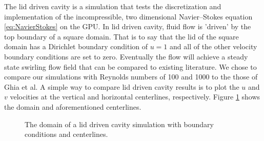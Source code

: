 The lid driven cavity is a simulation that tests the discretization and implementation of the incompressible, two dimensional Navier--Stokes equation \eqref{eq:NavierStokes} on the GPU. 
In lid driven cavity, fluid flow is 'driven' by the top boundary of a square domain. 
That is to say that the lid of the square domain has a Dirichlet boundary condition of $u=1$ and all of the other velocity boundary conditions are set to zero. 
Eventually the flow will achieve a steady state swirling flow field that can be compared to existing literature. 
We chose to compare our simulations with Reynolds numbers of 100 and 1000 to the those of Ghia et al\cite{Ghia:1982el}. 
A simple way to compare lid driven cavity results is to plot the $u$ and $v$ velocities at the vertical and horizontal centerlines, respectively. 
Figure \ref{fig:lid driven cavity} shows the domain and aforementioned centerlines. 
\begin{figure}[!htb]
	\centering
	
	\caption{The domain of a lid driven cavity simulation with boundary conditions and centerlines.}
	\label{fig:lid driven cavity}
\end{figure}

